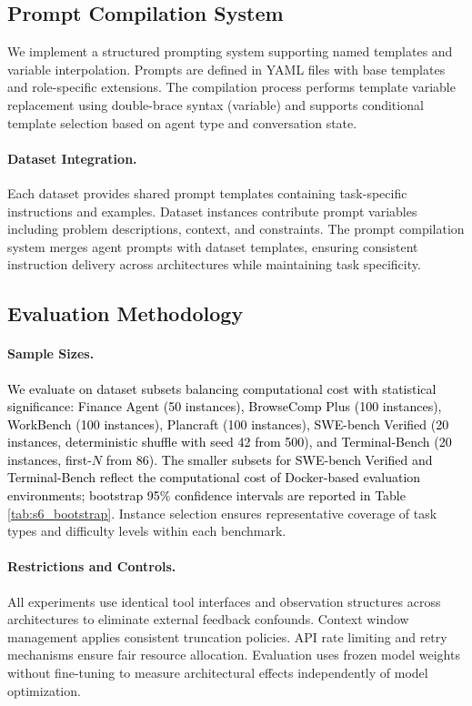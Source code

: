 \subsection{Prompt Compilation System}

We implement a structured prompting system supporting named templates and variable interpolation. Prompts are defined in YAML files with base templates and role-specific extensions.
The compilation process performs template variable replacement using double-brace syntax ({{variable}}) and supports conditional template selection based on agent type and conversation state.

\paragraph{Dataset Integration.}
Each dataset provides shared prompt templates containing task-specific instructions and examples. Dataset instances contribute prompt variables including problem descriptions,
context, and constraints. The prompt compilation system merges agent prompts with dataset templates, ensuring consistent instruction delivery across architectures while maintaining task specificity.

\subsection{Evaluation Methodology}

\paragraph{Sample Sizes.}
\textcolor{black}{We evaluate on dataset subsets balancing computational cost with statistical significance: Finance Agent (50 instances), BrowseComp Plus (100 instances), WorkBench (100 instances), Plancraft (100 instances), SWE-bench Verified (20 instances, deterministic shuffle with seed 42 from 500), and Terminal-Bench (20 instances, first-$N$ from 86). The smaller subsets for SWE-bench Verified and Terminal-Bench reflect the computational cost of Docker-based evaluation environments; bootstrap 95\% confidence intervals are reported in Table \ref{tab:s6_bootstrap}.} Instance selection ensures representative coverage of task types and difficulty levels within each benchmark.

\paragraph{Restrictions and Controls.}
All experiments use identical tool interfaces and observation structures across architectures to eliminate external feedback confounds. Context window management applies consistent truncation policies. API rate limiting and retry mechanisms ensure fair resource allocation. Evaluation uses frozen model weights without fine-tuning to measure architectural effects independently of model optimization.

